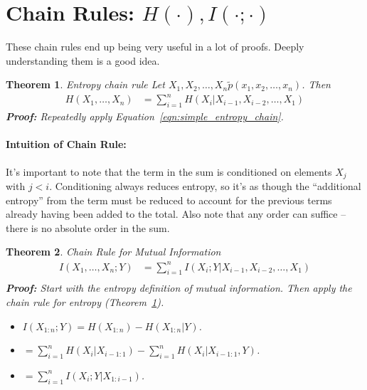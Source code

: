 \documentclass[a4paper,12pt]{report}
\newtheorem{theorem}{Theorem}
\begin{document}
\section{Chain Rules: $H(\cdot), I(\cdot ; \cdot)$}

These chain rules end up being very useful in a lot of proofs. Deeply
understanding them is a good idea. 

\begin{theorem}{Entropy chain rule}
\label{thm:entropy_chain_rule}
Let $X_1, X_2, \dots, X_n \tilde p(x_1, x_2, \dots, x_n)$. Then 
\begin{align}
	\label{eqn:entropy_chain_rule}
	H(X_1, \dots, X_n) &= \sum_{i=1}^{n} H(X_i | X_{i-1}, X_{i-2}, \dots, X_1)
\end{align}
\textbf{Proof: } Repeatedly apply Equation~\ref{eqn:simple_entropy_chain}.
\end{theorem}

\paragraph{Intuition of Chain Rule: } It's important to note that the term in
the sum is conditioned on elements $X_j$ with $j < i$. Conditioning always
reduces entropy, so it's as though the ``additional entropy'' from the term must
be reduced to account for the previous terms already having been added to the
total. Also note that any order can suffice -- there is no absolute order in the
sum.



\begin{theorem}{Chain Rule for Mutual Information}
\begin{align}
	\label{eqn:chain_rule_MI}
	I(X_1, \dots, X_n; Y) &= \sum_{i=1}^{n} I(X_i; Y | X_{i-1}, X_{i-2}, \dots,
	X_1) \\
\end{align}
\textbf{Proof: } Start with the entropy definition of mutual information. Then
apply the chain rule for entropy (Theorem~\ref{thm:entropy_chain_rule}).
\begin{itemize}
\item $I(X_{1:n} ; Y) = H(X_{1:n}) - H(X_{1:n} | Y)$.
\item $= \sum_{i=1}^{n} H(X_i | X_{i-1:1}) - \sum_{i=1}^{n} H(X_i | X_{i-1:1},
Y)$.
\item $= \sum_{i=1}^{n} I(X_i; Y | X_{1:i-1})$.
\end{itemize}
\end{theorem}
\end{document}
